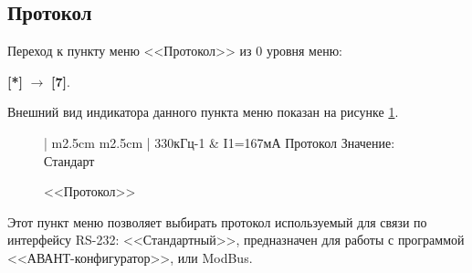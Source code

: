 \subsection{Протокол}

Переход к пункту меню <<Протокол>> из 0 уровня меню: 

\textbf{[*]} $\rightarrow$ \textbf{[7]}.

Внешний вид индикатора данного пункта меню показан на рисунке \ref{fig:protocol}.
 
 \begin{figure}[H]
 	\centering
 	
	\begin{tabular}{| m{2.5cm}  m{2.5cm} |}
		\firsthline
		330кГц-1	& \raggedleft I1=167мА			\tabularnewline 
		 {Протокол}				\tabularnewline
		 {Значение: Стандарт} 	\tabularnewline 
		 {}						\tabularnewline 
		\lasthline
	\end{tabular} 
	
	\caption{<<Протокол>>}
	\label{fig:protocol}
\end{figure}

Этот пункт меню позволяет выбирать протокол используемый для связи по интерфейсу RS-232: <<Стандартный>>, предназначен для работы с программой <<АВАНТ-конфигуратор>>, или ModBus.